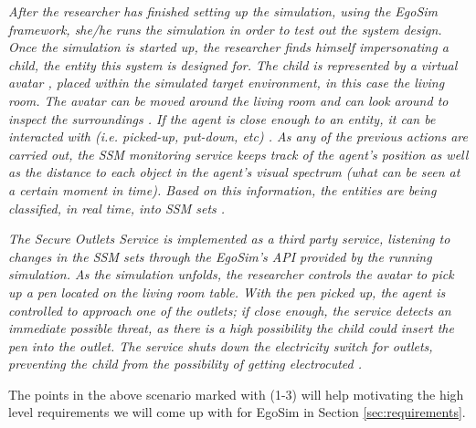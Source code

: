 \begin{flushright}{\slshape
After the researcher has finished setting up the simulation, using the EgoSim framework, she/he runs the simulation in order to test out the system design. Once the simulation is started up, the researcher finds himself impersonating a child, the entity this system is designed for. The child is represented by a virtual avatar , placed within the simulated target environment, in this case the living room. The avatar can be moved around the living room  and can look around to inspect the surroundings . If the agent is close enough to an entity, it can be interacted with (i.e. picked-up, put-down, etc) . As any of the previous actions are carried out, the SSM monitoring service  keeps track of the agent's position as well as the distance to each object in the agent's visual spectrum (what can be seen at a certain moment in time). Based on this information, the entities are being classified, in real time, into SSM sets .
} \\ \medskip
\end{flushright}

\begin{flushright}{\slshape
The Secure Outlets Service is implemented as a third party service, listening to changes in the SSM sets through the EgoSim's API provided by the running simulation. As the simulation unfolds, the researcher controls the avatar to pick up a pen located on the living room table. With the pen picked up, the agent is controlled to approach one of the outlets; if close enough, the service detects an immediate possible threat, as there is a high possibility the child could insert the pen into the outlet. The service shuts down the electricity switch for outlets, preventing the child from the possibility of getting electrocuted .
} \\ \medskip
\end{flushright}

The points in the above scenario marked with (1-3) will help motivating the high level requirements we will come up with for EgoSim in Section \ref{sec:requirements}.
